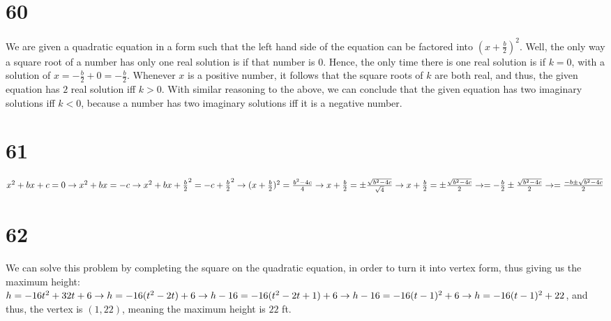 \documentclass{article}
\theoremstyle{definition}
\begin{document}
\section*{60}
We are given a quadratic equation in a form such that the left hand side of the equation can be factored into $(x+\frac{b}{2})^2$. Well, the only way 
a square root of a number has only one real solution is if that number is $0$. Hence, the only time there is one real solution is if $k=0$, with a solution 
of $x=-\frac{b}{2}+0=-\frac{b}{2}$. Whenever $x$ is a positive number, it follows that the square roots of $k$ are both real, and thus, the given 
equation has $2$ real solution iff $k>0$. With similar reasoning to the above, we can conclude that the given equation has two imaginary solutions iff $k<0$,
 because a number has two imaginary solutions iff it is a negative number. 


\section*{61}
$x^2+bx+c=0\newline\rightarrow x^2+bx=-c\newline\rightarrow x^2+bx+\frac{b}{2}^2=-c+\frac{b}{2}^2\newline\rightarrow 
(x+\frac{b}{2})^2=\frac{b^2-4c}{4}\newline\rightarrow x+\frac{b}{2}=\pm\frac{\sqrt{b^2-4c}}{\sqrt{4}}\newline\rightarrow 
x+\frac{b}{2}=\pm\frac{\sqrt{b^2-4c}}{2}\newline\rightarrow =-\frac{b}{2}\pm\frac{\sqrt{b^2-4c}}{2}\newline\rightarrow =\frac{-b\pm \sqrt{b^2-4c}}{2}$

\section*{62}
We can solve this problem by completing the square on the quadratic equation, in order to turn it into vertex form, thus giving us  
the maximum height:\newline $h=-16t^2+32t+6\newline\rightarrow h=-16(t^2-2t)+6\newline\rightarrow h-16=-16(t^2-2t+1)+6\newline\rightarrow 
h-16=-16(t-1)^2+6\newline\rightarrow h=-16(t-1)^2+22$, and thus, the vertex is $(1,22)$, meaning the maximum height is $22$ ft.
\end{document}
